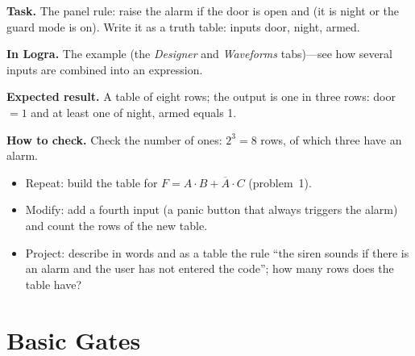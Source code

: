 \begin{diybox}
\textbf{Task.} The panel rule: raise the alarm if the door is open and (it is night or
the guard mode is on). Write it as a truth table: inputs door, night, armed.\par
\textbf{In Logra.} The  example (the \emph{Designer} and
\emph{Waveforms} tabs)---see how several inputs are combined into an
expression.\par
\textbf{Expected result.} A table of eight rows; the output is one in three
rows: door${}=1$ and at least one of night, armed equals 1.\par
\textbf{How to check.} Check the number of ones: $2^3=8$ rows, of which three have
an alarm.
\begin{itemize}[leftmargin=3.4em,labelwidth=3em,labelsep=0.4em,align=left]
  \item[\stars{1}] Repeat: build the table for $F = A\cdot B + \overline{A}\cdot C$
    (problem~1).
  \item[\stars{2}] Modify: add a fourth input (a panic button that always triggers the alarm)
    and count the rows of the new table.
  \item[\stars{3}] Project: describe in words and as a table the rule ``the siren sounds if
    there is an alarm and the user has not entered the code''; how many rows does the table have?
\end{itemize}
\end{diybox}

\section{Basic Gates}

\newcommand{\gaterow}[5]{%
  \begin{tikzpicture}[baseline=-1mm]
    \node[#1] (g) at (0,0) {};
    \ifstrequal{#1}{gNOT}{\draw[wire] (g.input) -- ++(-0.35,0);}{%
      \draw[wire] (g.input 1) -- ++(-0.35,0); \draw[wire] (g.input 2) -- ++(-0.35,0);}
    \draw[wire] (g.output) -- ++(0.35,0);
  \end{tikzpicture} &
  \begin{tikzpicture}[baseline=-1mm]
    \node[#2] (h) at (0,0) {};
    \ifstrequal{#2}{iNOT}{\draw[wire] (h.input) -- ++(-0.35,0);}{%
      \draw[wire] (h.input 1) -- ++(-0.35,0); \draw[wire] (h.input 2) -- ++(-0.35,0);}
    \draw[wire] (h.output) -- ++(0.35,0);
  \end{tikzpicture} & #3 & #4 & #5 \\[6mm]}

